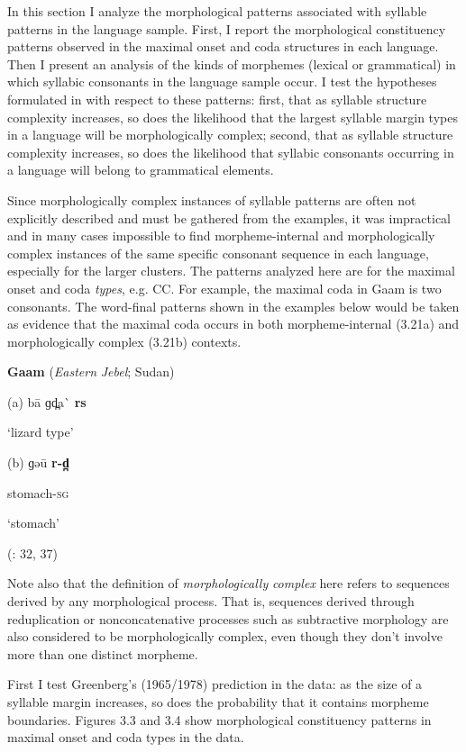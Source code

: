   In this section I analyze the morphological patterns associated with syllable patterns in the language sample. First, I report the morphological constituency patterns observed in the maximal onset and coda structures in each language. Then I present an analysis of the kinds of morphemes (lexical or grammatical) in which syllabic consonants in the language sample occur. I test the hypotheses formulated in  with respect to these patterns: first, that as syllable structure complexity increases, so does the likelihood that the largest syllable margin types in a language will be morphologically complex; second, that as syllable structure complexity increases, so does the likelihood that syllabic consonants occurring in a language will belong to grammatical elements.

  Since morphologically complex instances of syllable patterns are often not explicitly described and must be gathered from the examples, it was impractical and in many cases impossible to find morpheme-internal and morphologically complex instances of the same specific consonant sequence in each language, especially for the larger clusters. The patterns analyzed here are for the maximal onset and coda \textit{types}, e.g. CC. For example, the maximal coda in Gaam is two consonants. The word-final patterns shown in the examples below would be taken as evidence that the maximal coda occurs in both morpheme-internal (3.21a) and morphologically complex (3.21b) contexts.

\ea\label{ex:(3.21)}
   \textbf{Gaam} (\textit{Eastern} \textit{Jebel}; Sudan)

(a)  ba\={} ɡd̪a\`{} \textbf{rs}

‘lizard type’

(b)  ɡəu\={} \textbf{r-d̪}

stomach-\textsc{sg}

‘stomach’

(\citealt{Stirtz2011}: 32, 37)

\z

  Note also that the definition of \textit{morphologically} \textit{complex} here refers to sequences derived by any morphological process. That is, sequences derived through reduplication or nonconcatenative processes such as subtractive morphology are also considered to be morphologically complex, even though they don’t involve more than one distinct morpheme.

  First I test Greenberg’s (1965/1978) prediction in the data: as the size of a syllable margin increases, so does the probability that it contains morpheme boundaries. Figures 3.3 and 3.4 show morphological constituency patterns in maximal onset and coda types in the data.

